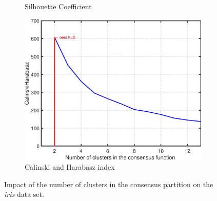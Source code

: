 \documentclass[10pt]{acmtrans2e}
\begin{document}
\begin{figure}[!bt]
\begin{subfigure}[t]{0.32\textwidth}
  \caption{Silhouette Coefficient}
  \label{fig:iris_silhouettecoefficient}
\end{subfigure}%
\hspace*{1mm}
\begin{subfigure}[t]{0.32\textwidth}
  \includegraphics[width=\textwidth]{fig/iris_u_c_std_evacluster_CH.eps}
  \caption{Calinski and Harabasz index}
  \label{fig:iris_ch}
\end{subfigure}%
\caption{Impact of the number of clusters in the consensus partition on the \textit{iris} data set.}
\label{fig:kimpact} %
\end{figure}
\end{document}
